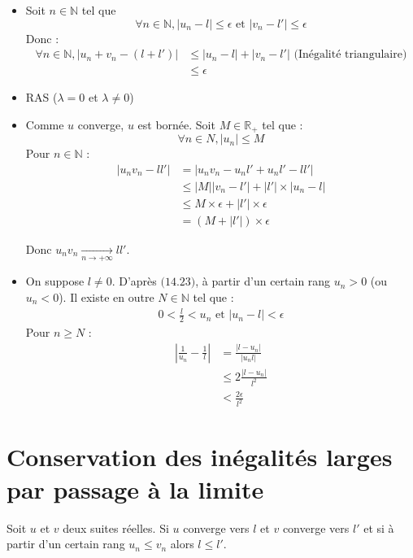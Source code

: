 \documentclass[../main.tex]{subfiles}
\begin{document}
\begin{itemize}
    \item Soit $n \in \mathbb{N}$ tel que 
    $$\forall n \in \mathbb{N}, |u_n - l| \leq \epsilon \text{ et } |v_n - l'| \leq \epsilon$$
    Donc : 
    \begin{align*}
        \forall n \in \mathbb{N}, |u_n + v_n - (l + l')| &\leq |u_n - l| + |v_n - l'| \text{ (Inégalité triangulaire)} \\
        &\leq \epsilon
    \end{align*}

    \item RAS ($\lambda = 0$ et $\lambda \neq 0$)

    \item Comme $u$ converge, $u$ est bornée. Soit $M \in \mathbb{R}_+$ tel que : 
    $$\forall n \in N, |u_n| \leq M$$
    Pour $n \in \mathbb{N}$ : 
    \begin{align*}
        |u_n v_n - ll'| &= |u_n v_n - u_n l' + u_n l' - ll'| \\
        &\leq |M| |v_n - l'| + |l'| \times |u_n - l| \\
        &\leq M \times \epsilon + |l'| \times \epsilon \\
        &= (M + |l'|) \times \epsilon
    \end{align*}

    Donc $\boxed{u_n v_n \underset{n \to +\infty}{\longrightarrow}  ll'}$. 

    \item On suppose $l \neq 0$. D'après $\text{(14.23)}$, à partir d'un certain rang $u_n > 0$ (ou $u_n < 0$). Il existe en outre $N \in \mathbb{N}$ tel que : 
    \begin{align*}
        0 < \frac{l}{2} < u_n \text{ et } |u_n - l| < \epsilon
    \end{align*}
    Pour $n \geq N$ : 
    \begin{align*}
        \left| \frac{1}{u_n} - \frac{1}{l} \right| &= \frac{|l - u_n|}{|u_n l|} \\
        &\leq 2 \frac{|l - u_n|}{l^2} \\
        &< \frac{2 \epsilon}{l^2}
    \end{align*}
\end{itemize}

\section{Conservation des inégalités larges par passage à la limite}
\begin{tcolorbox}[title=Théorème 14.35, title filled=false, colframe=orange, colback=orange!10!white]
    Soit $u$ et $v$ deux suites réelles. Si $u$ converge vers $l$ et $v$ converge vers $l'$ et si à partir d'un certain rang $u_n \leq v_n$ alors $l \leq l'$. 
\end{tcolorbox}
\end{document}
